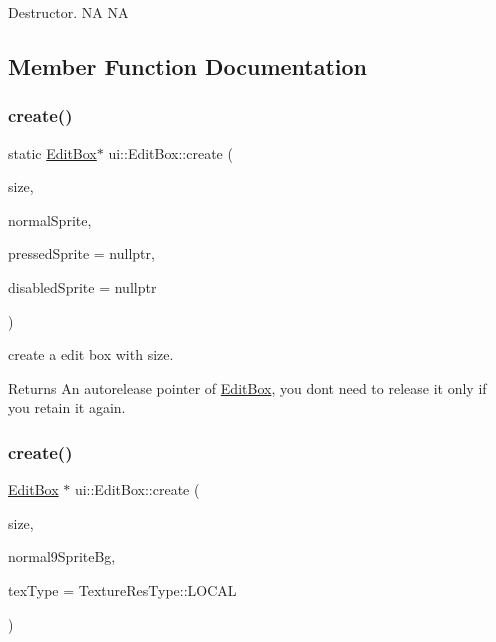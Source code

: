 Destructor.  NA  NA 

\subsection{Member Function Documentation}
\mbox{\label{classui_1_1EditBox_a49123784600ab9e7913688fc199ca5b1}} 
\subsubsection{\texorpdfstring{create()}{create()}\hspace{0.1cm}{\footnotesize\ttfamily [1/5]}}
{\footnotesize\ttfamily static \hyperlink{classui_1_1EditBox}{Edit\+Box}$\ast$ ui\+::\+Edit\+Box\+::create (\begin{DoxyParamCaption}\item[{const \hyperlink{classSize}{Size} \&}]{size,  }\item[{\hyperlink{classui_1_1Scale9Sprite}{Scale9\+Sprite} $\ast$}]{normal\+Sprite,  }\item[{\hyperlink{classui_1_1Scale9Sprite}{Scale9\+Sprite} $\ast$}]{pressed\+Sprite = {\ttfamily nullptr},  }\item[{\hyperlink{classui_1_1Scale9Sprite}{Scale9\+Sprite} $\ast$}]{disabled\+Sprite = {\ttfamily nullptr} }\end{DoxyParamCaption})\hspace{0.3cm}{\ttfamily [static]}}

create a edit box with size. \begin{DoxyReturn}{Returns}
An autorelease pointer of \hyperlink{classui_1_1EditBox}{Edit\+Box}, you don\textquotesingle{}t need to release it only if you retain it again. 
\end{DoxyReturn}
\mbox{\label{classui_1_1EditBox_a7426d58fa48283337dc62f12863e085a}} 
\subsubsection{\texorpdfstring{create()}{create()}\hspace{0.1cm}{\footnotesize\ttfamily [2/5]}}
{\footnotesize\ttfamily \hyperlink{classui_1_1EditBox}{Edit\+Box} $\ast$ ui\+::\+Edit\+Box\+::create (\begin{DoxyParamCaption}\item[{const \hyperlink{classSize}{Size} \&}]{size,  }\item[{const std\+::string \&}]{normal9\+Sprite\+Bg,  }\item[{\hyperlink{classui_1_1Widget_a040a65ec5ad3b11119b7e16b98bd9af0}{Texture\+Res\+Type}}]{tex\+Type = {\ttfamily TextureResType\+:\+:LOCAL} }\end{DoxyParamCaption})\hspace{0.3cm}{\ttfamily [static]}}

